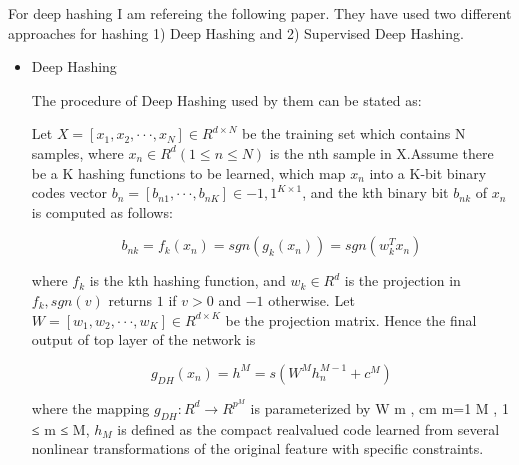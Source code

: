 \documentclass[12pt, a4paper,twoside]{article}
\begin{document}
	For deep hashing I am refereing the following paper\cite{DeepHashing}. They have used two different approaches for hashing 1) Deep Hashing and 2) Supervised Deep Hashing. 

\begin{itemize}
  \item Deep Hashing

	The procedure of Deep Hashing used by them can be stated as:

	Let  $X = [x_{1}, x_{2} , · · · , x_{N} ] \in R^{d\times N}$ be the training set which contains N samples, where $x_{n} \in R^{d} (1 \leq n \leq N)$  is the nth sample in X.Assume there be a K hashing functions to be learned, which map $x_{n}$ into a K-bit binary codes vector  $b_{n} = [b_{n1} , · · · , b_{nK} ] \in {−1, 1}^{K \times 1}$, and the kth binary bit $b_{nk}$ of $x_{n}$ is computed as follows:

	\begin{equation}
        b_{nk} = f_{k} (x_{n} ) = sgn(g_{k}(x_{n})) = sgn(w_{k}^{T}x_{n})
        \label{eq2}
    \end{equation}
  
	where $f_{k}$ is the kth hashing function, and $w_{k} \in R^{d}$ is the projection in $f_{k} , sgn(v)$ returns $1$ if $v > 0$ and $-1$ otherwise. Let $W = [w_{1} , w_{2} , · · · , w_{K} ] \in R^{d\times K}$ be the projection matrix. Hence the final output of top layer of the network is 

	\begin{equation}
        g_{DH}(x_{n}) = h^{M} = s(W^{M}h_{n}^{M-1}+c^{M})
        \label{eq3}
    \end{equation}

    where the mapping $g_{DH}:R^{d}\rightarrow R^{p^{M}}$ is parameterized by {W m , cm }m=1 M , 1 ≤ m ≤ M, $h_{M}$ is defined as the compact realvalued code learned from several nonlinear transformations of the original feature with specific constraints. 
\end{itemize}
\end{document}
